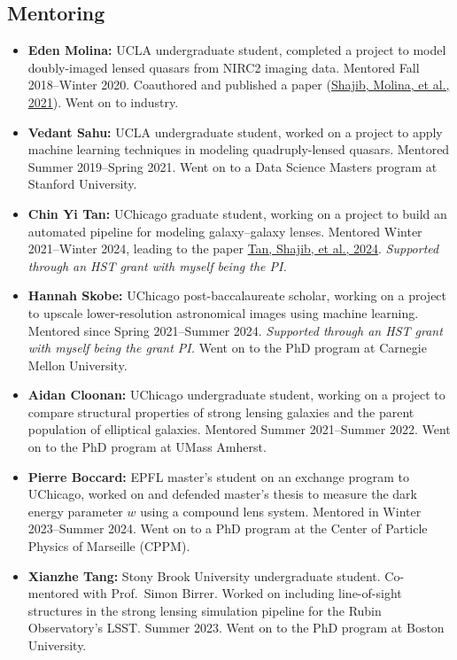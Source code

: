 \documentclass[margin, line]{res}
\begin{document}
\begin{resume}
\section{\sc Mentoring}
\begin{itemize}
	\item \textbf{Eden Molina:} UCLA undergraduate student, completed a project to model doubly-imaged lensed quasars from NIRC2 imaging data. Mentored Fall 2018--Winter 2020. Coauthored and published a paper (\href{https://doi:10.1093/mnras/stab532}{Shajib, Molina, et al., 2021}). Went on to industry.
	\item \textbf{Vedant Sahu:} UCLA undergraduate student, worked on a project to apply machine learning techniques in modeling quadruply-lensed quasars. Mentored Summer 2019--Spring 2021. Went on to a Data Science Masters program at Stanford University.
	\item \textbf{Chin Yi Tan:} UChicago graduate student, working on a project to build an automated pipeline for modeling galaxy--galaxy lenses. Mentored Winter 2021--Winter 2024, leading to the paper \href{https://ui.adsabs.harvard.edu/abs/2023arXiv231109307T/abstract}{Tan, Shajib, et al., 2024}. \textit{Supported through an \textsc{HST} grant with myself being the PI.}
	\item \textbf{Hannah Skobe:} UChicago post-baccalaureate scholar, working on a project to upscale lower-resolution astronomical images using machine learning. Mentored since Spring 2021--Summer 2024. \textit{Supported through an HST grant with myself being the grant PI.} Went on to the PhD program at Carnegie Mellon University.
	\item \textbf{Aidan Cloonan:} UChicago undergraduate student, working on a project to compare structural properties of strong lensing galaxies and the parent population of elliptical galaxies. Mentored Summer 2021--Summer 2022. Went on to the PhD program at UMass Amherst.
	\item \textbf{Pierre Boccard:} EPFL master's student on an exchange program to UChicago, worked on and defended master's thesis to measure the dark energy parameter $w$ using a compound lens system. Mentored in Winter 2023--Summer 2024. Went on to a PhD program at the Center of Particle Physics of Marseille (CPPM).
	\item \textbf{Xianzhe Tang:} Stony Brook University undergraduate student. Co-mentored with Prof.~Simon Birrer. Worked on including line-of-sight structures in the strong lensing simulation pipeline for the Rubin Observatory's LSST. Summer 2023. Went on to the PhD program at Boston University.

\end{itemize}
\end{resume}
\end{document}
